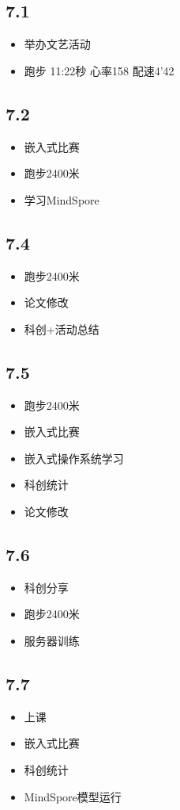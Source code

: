 \documentclass[UTF8]{ctexart}
\begin{document}
\subsection*{7.1}
\begin{itemize}
    \item 举办文艺活动
    \item 跑步 11:22秒 心率158 配速4'42
\end{itemize}
\subsection*{7.2}
\begin{itemize}
    \item 嵌入式比赛
    \item 跑步2400米
    \item 学习MindSpore
\end{itemize}
\subsection*{7.4}
\begin{itemize}
    \item 跑步2400米
    \item 论文修改
    \item 科创+活动总结
\end{itemize}
\subsection*{7.5}
\begin{itemize}
    \item 跑步2400米
    \item 嵌入式比赛
    \item 嵌入式操作系统学习
    \item 科创统计
    \item 论文修改
\end{itemize}
\subsection*{7.6}
\begin{itemize}
    \item 科创分享
    \item 跑步2400米
    \item 服务器训练
\end{itemize}
\subsection*{7.7}
\begin{itemize}
    \item 上课
    \item 嵌入式比赛
    \item 科创统计
    \item MindSpore模型运行
\end{itemize}
\end{document}
